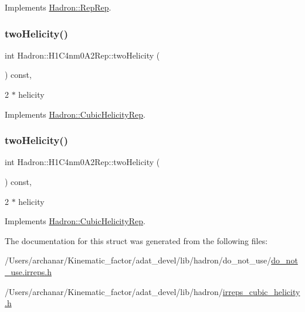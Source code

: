 Implements \mbox{\hyperlink{structHadron_1_1RepRep_ab3213025f6de249f7095892109575fde}{Hadron\+::\+Rep\+Rep}}.

\mbox{\label{structHadron_1_1H1C4nm0A2Rep_a0cd7ca19a38e71a97d7cbd87c8aa5617}} 
\subsubsection{\texorpdfstring{twoHelicity()}{twoHelicity()}\hspace{0.1cm}{\footnotesize\ttfamily [1/2]}}
{\footnotesize\ttfamily int Hadron\+::\+H1\+C4nm0\+A2\+Rep\+::two\+Helicity (\begin{DoxyParamCaption}{ }\end{DoxyParamCaption}) const\hspace{0.3cm}{\ttfamily [inline]}, {\ttfamily [virtual]}}

2 $\ast$ helicity 

Implements \mbox{\hyperlink{structHadron_1_1CubicHelicityRep_af507aa56fc2747eacc8cb6c96db31ecc}{Hadron\+::\+Cubic\+Helicity\+Rep}}.

\mbox{\label{structHadron_1_1H1C4nm0A2Rep_a0cd7ca19a38e71a97d7cbd87c8aa5617}} 
\subsubsection{\texorpdfstring{twoHelicity()}{twoHelicity()}\hspace{0.1cm}{\footnotesize\ttfamily [2/2]}}
{\footnotesize\ttfamily int Hadron\+::\+H1\+C4nm0\+A2\+Rep\+::two\+Helicity (\begin{DoxyParamCaption}{ }\end{DoxyParamCaption}) const\hspace{0.3cm}{\ttfamily [inline]}, {\ttfamily [virtual]}}

2 $\ast$ helicity 

Implements \mbox{\hyperlink{structHadron_1_1CubicHelicityRep_af507aa56fc2747eacc8cb6c96db31ecc}{Hadron\+::\+Cubic\+Helicity\+Rep}}.



The documentation for this struct was generated from the following files\+:\begin{DoxyCompactItemize}
\item 
/\+Users/archanar/\+Kinematic\+\_\+factor/adat\+\_\+devel/lib/hadron/do\+\_\+not\+\_\+use/\mbox{\hyperlink{do__not__use_8irreps_8h}{do\+\_\+not\+\_\+use.\+irreps.\+h}}\item 
/\+Users/archanar/\+Kinematic\+\_\+factor/adat\+\_\+devel/lib/hadron/\mbox{\hyperlink{lib_2hadron_2irreps__cubic__helicity_8h}{irreps\+\_\+cubic\+\_\+helicity.\+h}}\end{DoxyCompactItemize}
